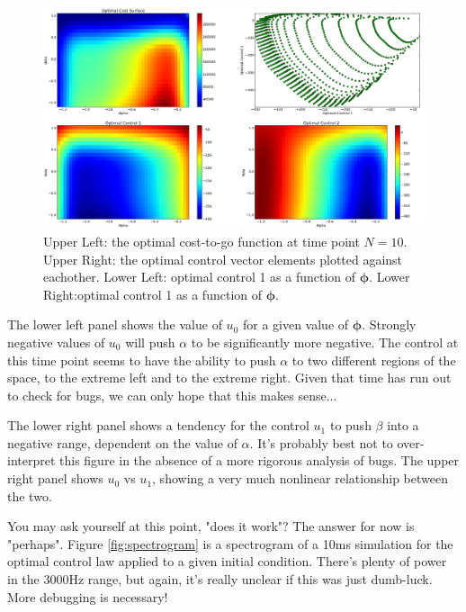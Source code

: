 \documentclass{article} %
\begin{document}
\begin{figure}[h]
\centering
\includegraphics[width=1.0\textwidth]{images/cost_and_control.png}
\caption{Upper Left: the optimal cost-to-go function at time point $N=10$.
         Upper Right: the optimal control vector elements plotted against eachother.
         Lower Left: optimal control 1 as a function of $\bm{\phi}$.
         Lower Right:optimal control 1 as a function of $\bm{\phi}$. }
\label{fig:cost_and_control}
\end{figure}

The lower left panel shows the value of $u_0$ for a given
value of $\bm{\phi}$. Strongly negative values of $u_0$ will push $\alpha$ to be significantly
more negative. The control at this time point seems to have the ability to push $\alpha$ to
two different regions of the space, to the extreme left and to the extreme right. Given
that time has run out to check for bugs, we can only hope that this makes sense...

The lower right panel shows a tendency for the control $u_1$ to push $\beta$ into a negative
range, dependent on the value of $\alpha$. It's probably best not to over-interpret this
figure in the absence of a more rigorous analysis of bugs. The upper right panel shows
$u_0$ vs $u_1$, showing a very much nonlinear relationship between the two.

You may ask yourself at this point, "does it work"? The answer for now is "perhaps". Figure
\ref{fig:spectrogram} is a spectrogram of a 10ms simulation for the optimal control law
applied to a given initial condition. There's plenty of power in the 3000Hz range, but again,
it's really unclear if this was just dumb-luck. More debugging is necessary!
\end{document}
